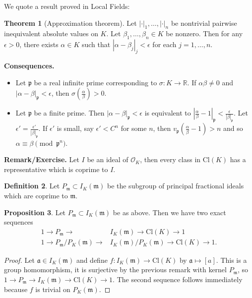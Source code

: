 \documentclass{article}
\theoremstyle{definition}
\newtheorem{theorem}{Theorem}[section]
\newtheorem{prop}[theorem]{Proposition}
\newtheorem{defn}[theorem]{Definition}
\begin{document}
\vspace{1mm}
 
We quote a result proved in Local Fields:
\begin{theorem}[Approximation theorem]
    Let $|\cdot|_1,\ldots,|\cdot|_n$ be nontrivial pairwise inequivalent absolute values on $K$. Let $\beta_1,\ldots,\beta_n \in K$ be nonzero. Then for any $\epsilon>0$, there exists $\alpha \in K$ such that $|\alpha-\beta_j|_j <\epsilon$ for each $j = 1,\ldots,n$.
\end{theorem}
\textbf{Consequences.} 
\begin{itemize}
    \item Let $\mathfrak{p}$ be a real infinite prime corresponding to $\sigma : K \to \mathbb{R}$. If $\alpha \beta \neq 0$ and $|\alpha-\beta|_{\mathfrak{p}}<\epsilon$, then $\sigma \left(\frac{\alpha}{\beta}\right) > 0$.
    \item Let $\mathfrak{p}$ be a finite prime. Then $|\alpha-\beta|_{\mathfrak{p}}<\epsilon$ is equivalent to $\left|\frac{\alpha}{\beta}-1 \right|_{\mathfrak{p}} < \frac{\epsilon}{|\beta|_{\mathfrak{p}}}$. Let $\epsilon' = \frac{\epsilon'}{|\beta|_{\mathfrak{p}}}$. If $\epsilon'$ is small, say $\epsilon' < C^n$ for some $n$, then $v_{\mathfrak{p}}\left(\frac{\alpha}{\beta}-1\right) > n$ and so $\alpha \equiv  \beta \pmod{\mathfrak{p}^n}$.
\end{itemize}
\textbf{Remark/Exercise.} Let $I$ be an ideal of $\mathcal{O}_K$, then every class in $\text{Cl}(K)$ has a representative which is coprime to $I$.
\begin{defn}
    Let $P_{\mathfrak{m}} \subset I_K(\mathfrak{m})$ be the subgroup of principal fractional ideals which are coprime to $\mathfrak{m}$.
\end{defn}
\begin{prop}\label{prop1.5}
    Let $P_{\mathfrak{m}} \subset I_K(\mathfrak{m})$ be as above. Then we have two exact sequences
    \begin{align*}
        1 \to P_{\mathfrak{m}} \to &I_K(\mathfrak{m}) \to \text{Cl}(K) \to 1\\
        1 \to P_{\mathfrak{m}}/P_K(\mathfrak{m}) \to &I_K(\mathfrak{m})/P_K(\mathfrak{m}) \to \text{Cl}(K) \to 1.
    \end{align*}
\end{prop}
\begin{proof}
    Let $\mathfrak{a} \in I_K(\mathfrak{m})$ and define $f: I_K(\mathfrak{m}) \to \text{Cl}(K)$ by $\mathfrak{a}\mapsto [a]$. This is a group homomorphism, it is surjective by the previous remark with kernel $P_{\mathfrak{m}}$, so $1 \to P_{\mathfrak{m}} \to I_K(\mathfrak{m}) \to \text{Cl}(K) \to 1$. The second sequence follows immediately because $f$ is trivial on $P_K(\mathfrak{m})$.
\end{proof}
\end{document}
